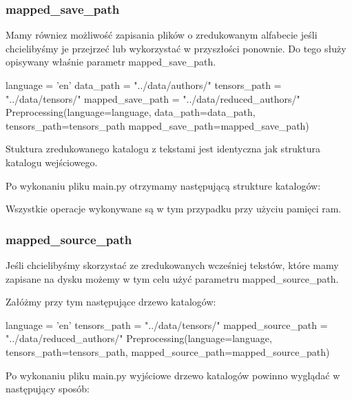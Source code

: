 \subsubsection{mapped\_save\_path}
Mamy równiez możliwość zapisania plików o zredukowanym alfabecie jeśli chcielibyśmy je przejrzeć lub
wykorzystać w przyszłości ponownie. Do tego służy opisywany właśnie parametr mapped\_save\_path.

\begin{python}
language = 'en'
data_path = "../data/authors/"
tensors_path = "../data/tensors/"
mapped_save_path = "../data/reduced_authors/"
Preprocessing(language=language,
              data_path=data_path,
              tensors_path=tensors_path
              mapped_save_path=mapped_save_path)
                   
\end{python}
Stuktura zredukowanego katalogu z tekstami jest identyczna jak struktura katalogu wejściowego. 

Po wykonaniu pliku main.py otrzymamy następującą strukture katalogów:

\myspace
{}
\myspace

Wszystkie operacje wykonywane są w tym przypadku przy użyciu pamięci ram.


\subsubsection{mapped\_source\_path}
Jeśli chcielibyśmy skorzystać ze zredukowanych wcześniej tekstów, które mamy zapisane na dysku 
możemy w tym celu użyć parametru mapped\_source\_path.

Załóżmy przy tym następujące drzewo katalogów:
\myspace
{}
\myspace

\begin{python}
language = 'en'
tensors_path = "../data/tensors/"
mapped_source_path = "../data/reduced_authors/"
Preprocessing(language=language,
              tensors_path=tensors_path,
              mapped_source_path=mapped_source_path)
                   
\end{python}

Po wykonaniu pliku main.py wyjściowe drzewo katalogów powinno wyglądać w następujący sposób:
\myspace
{}
\myspace

